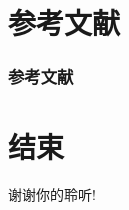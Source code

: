 \documentclass[
    10pt,
    pdf,
    UTF8,
    aspectratio=169
]{ctexbeamer}
\begin{document}
\section*{参考文献}
\begin{frame}[allowframebreaks]
    \frametitle{参考文献}
    \printbibliography
\end{frame}
  
\section*{结束}
\begin{frame}{}
    \centering
    \huge
    谢谢你的聆听!
\end{frame}
\end{document}
